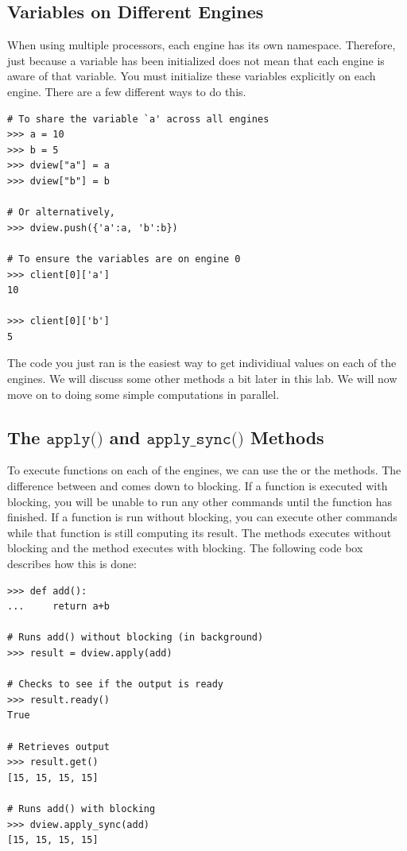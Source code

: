 \subsection*{Variables on Different Engines}
When using multiple processors, each engine has its own namespace. Therefore, just because a variable has been initialized does not mean that each engine is aware of that variable. You must initialize these variables explicitly on each engine. There are a few different ways to do this.

\begin{lstlisting}
# To share the variable `a' across all engines
>>> a = 10
>>> b = 5
>>> dview["a"] = a
>>> dview["b"] = b

# Or alternatively,
>>> dview.push({'a':a, 'b':b})

# To ensure the variables are on engine 0
>>> client[0]['a']
10

>>> client[0]['b']
5
\end{lstlisting}

The code you just ran is the easiest way to get individiual values on each of the engines. We will discuss some other methods a bit later in this lab. We will now move on to doing some simple computations in parallel.

\subsection*{The $\texttt{apply()}$ and $\texttt{apply\_sync()}$ Methods}
To execute functions on each of the engines, we can use the  or the  methods.  The difference between  and  comes down to blocking. If a function is executed with blocking, you will be unable to run any other commands until the function has finished. If a function is run without blocking, you can execute other commands while that function is still computing its result. The  methods executes without blocking and the  method executes with blocking. The following code box describes how this is done:

\begin{lstlisting}
>>> def add():
...     return a+b

# Runs add() without blocking (in background)
>>> result = dview.apply(add)

# Checks to see if the output is ready
>>> result.ready()
True

# Retrieves output
>>> result.get()
[15, 15, 15, 15]

# Runs add() with blocking
>>> dview.apply_sync(add)
[15, 15, 15, 15]
\end{lstlisting}

